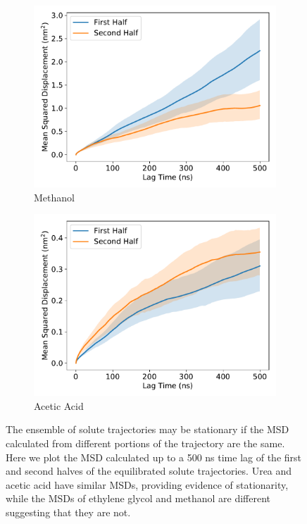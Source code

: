 \documentclass{article}
\begin{document}
\begin{figure}[h]
\begin{subfigure}{0.45\textwidth}
  \includegraphics[width=\textwidth]{MET_MSD_halves.pdf}
  \caption{Methanol}\label{fig:MET_MSD_halves}
  \end{subfigure}
  \begin{subfigure}{0.45\textwidth}
  \includegraphics[width=\textwidth]{ACH_MSD_halves.pdf}
  \caption{Acetic Acid}\label{fig:ACH_MSD_halves}
  \end{subfigure}
  \caption{The ensemble of solute trajectories may be stationary if the MSD
  calculated from different portions of the trajectory are the same. Here we
  plot the MSD calculated up to a 500 ns time lag of the first and second
  halves of the equilibrated solute trajectories. Urea and acetic acid have
  similar MSDs, providing evidence of stationarity, while the MSDs of 
  ethylene glycol and methanol are different suggesting that they are not.}\label{fig:msd_comparison}
  \end{figure}
\end{document}
